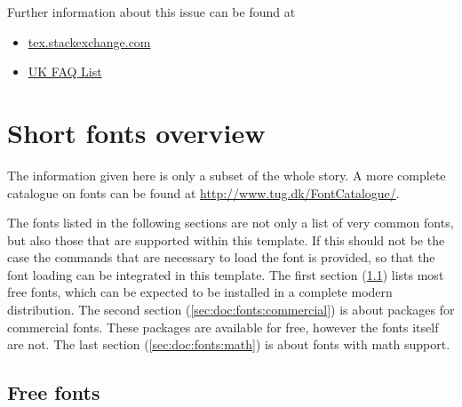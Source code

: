 Further information about this issue can be found at
\begin{itemize}
\item \href{http://tex.stackexchange.com/questions/15665/making-efficient-use-of-writes}{tex.stackexchange.com}
\item \href{http://www.tex.ac.uk/cgi-bin/texfaq2html?label=noroom}{UK FAQ List}
\end{itemize}

\chapter{Short fonts overview}
\label{chap:doc:fonts}

The information given here is only a subset of the whole story. A more complete catalogue on \latex fonts can be found at \href{http://www.tug.dk/FontCatalogue/}{http://www.tug.dk/FontCatalogue/}.

The fonts listed in the following sections are not only a list of very common fonts, but also those that are supported within this template. If this should not be the case the commands that are necessary to load the font is provided, so that the font loading can be integrated in this template. The first section (\ref{sec:doc:fonts:free}) lists most free fonts, which can be expected to be installed in a complete modern \latex distribution. The second section (\ref{sec:doc:fonts:commercial}) is about packages for commercial fonts. These packages are available for free, however the fonts itself are not. The last section (\ref{sec:doc:fonts:math}) is about fonts with math support.

\section{Free fonts}
\label{sec:doc:fonts:free}

